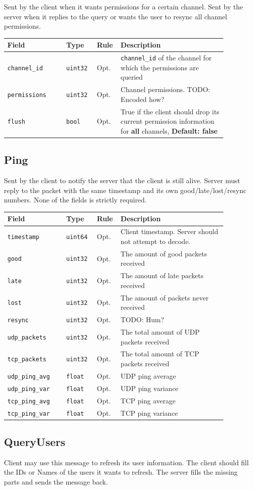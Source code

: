 \documentclass[11pt]{article} %
\newenvironment{mumbleMessageEx}
{%
	\small
	\renewcommand\arraystretch{1.5}
	\begin{tabular}{p{0.25\linewidth}p{0.13\linewidth}p{0.05\linewidth}p{0.45\linewidth}}
	Field & Type & Rule & Description \\
	\hline
}
{%
	\end{tabular}
	\renewcommand\arraystretch{1.0}
}
\newcommand{\mumbleMessageExItem}[4]{ \texttt{#1} & \texttt{#2} & #3 & #4 \\ }
\begin{document}
Sent by the client when it wants permissions for a certain channel. Sent by the server when it replies to the query or wants the user to resync all channel permissions.

\begin{mumbleMessageEx}
\mumbleMessageExItem{channel\_id}{uint32}{Opt.}{\texttt{channel\_id} of the channel for which the permissions are queried}
\mumbleMessageExItem{permissions}{uint32}{Opt.}{Channel permissions. TODO: Encoded how?}
\mumbleMessageExItem{flush}{bool}{Opt.}{True if the client should drop its current permission information for \textbf{all} channels, \textbf{Default: false}}
\end{mumbleMessageEx}

\subsection{Ping}
\label{msg:ping}

Sent by the client to notify the server that the client is still alive. Server must reply to the packet with the same timestamp and its own good/late/lost/resync numbers. None of the fields is strictly required.

\begin{mumbleMessageEx}
\mumbleMessageExItem{timestamp}{uint64}{Opt.}{Client timestamp. Server should not attempt to decode.}
\mumbleMessageExItem{good}{uint32}{Opt.}{The amount of good packets received}
\mumbleMessageExItem{late}{uint32}{Opt.}{The amount of late packets received}
\mumbleMessageExItem{lost}{uint32}{Opt.}{The amount of packets never received}
\mumbleMessageExItem{resync}{uint32}{Opt.}{TODO: Hum?}
\mumbleMessageExItem{udp\_packets}{uint32}{Opt.}{The total amount of UDP packets received}
\mumbleMessageExItem{tcp\_packets}{uint32}{Opt.}{The total amount of TCP packets received}
\mumbleMessageExItem{udp\_ping\_avg}{float}{Opt.}{UDP ping average}
\mumbleMessageExItem{udp\_ping\_var}{float}{Opt.}{UDP ping variance}
\mumbleMessageExItem{tcp\_ping\_avg}{float}{Opt.}{TCP ping average}
\mumbleMessageExItem{tcp\_ping\_var}{float}{Opt.}{TCP ping variance}
\end{mumbleMessageEx}

\subsection{QueryUsers}
\label{msg:queryUsers}

Client may use this message to refresh its user information. The client should fill the IDs or Names of the users it wants to refresh. The server fills the missing parts and sends the message back.
\end{document}
